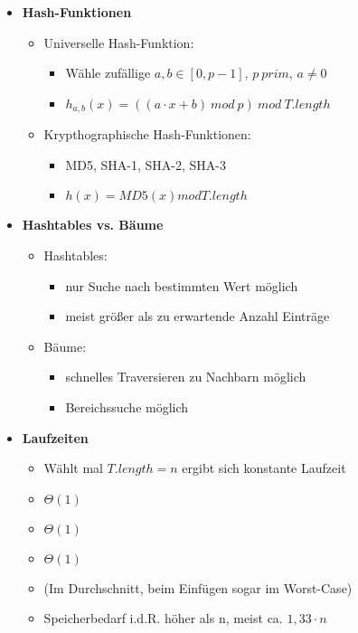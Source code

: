 \begin{itemize}
        \item \textbf{Hash-Funktionen}
            \begin{itemize}
                \item Universelle Hash-Funktion:
                    \begin{itemize}
                        \item Wähle zufällige $a,b \in [0, p - 1]$, $p~prim$, $a \neq 0$
                        \item $h_{a,b}(x)= ((a \cdot x + b)~mod~p)~mod~T.length$
                    \end{itemize}
                \item Krypthographische Hash-Funktionen:
                    \begin{itemize}
                        \item MD5, SHA-1, SHA-2, SHA-3
                        \item $h(x) = MD5(x) mod T.length$
                    \end{itemize}
            \end{itemize}

        \item \textbf{Hashtables vs. Bäume}
            \begin{itemize}
                \item Hashtables:
                    \begin{itemize}
                        \item nur Suche nach bestimmten Wert möglich
                        \item meist größer als zu erwartende Anzahl Einträge
                    \end{itemize}
                \item Bäume:
                    \begin{itemize}
                        \item schnelles Traversieren zu Nachbarn möglich
                        \item Bereichssuche möglich
                    \end{itemize}
            \end{itemize}
        
        \item \textbf{Laufzeiten}
            \begin{itemize}
                \item Wählt mal $T.length = n$ ergibt sich konstante Laufzeit
                \item {} $\Theta(1)$
                \item {} $\Theta(1)$
                \item {} $\Theta(1)$
                \item (Im Durchschnitt, beim Einfügen sogar im Worst-Case)
                \item Speicherbedarf i.d.R. höher als n, meist ca. $1,33 \cdot n$
            \end{itemize}
    \end{itemize}

